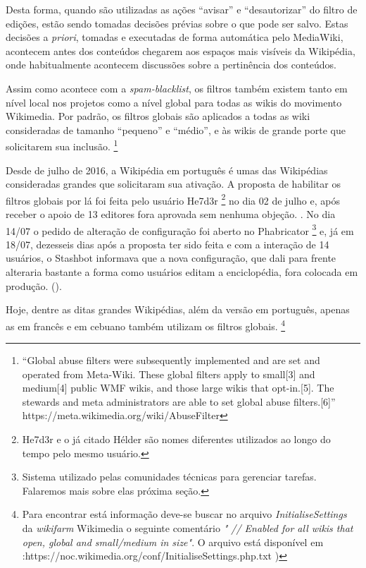 Desta forma, quando são utilizadas as ações ``avisar'' e ``desautorizar'' do filtro de edições, estão sendo tomadas decisões prévias sobre o que pode ser salvo. Estas decisões a \textit{priori}, tomadas e executadas de forma automática pelo MediaWiki, acontecem antes dos conteúdos chegarem aos espaços mais visíveis da Wikipédia, onde habitualmente acontecem discussões sobre a pertinência dos conteúdos.


Assim como acontece com a \textit{spam-blacklist}, os filtros também existem tanto em nível local nos projetos como a nível global para todas as wikis do movimento Wikimedia. Por padrão, os filtros globais são aplicados a todas as wiki consideradas de tamanho ``pequeno'' e ``médio'', e às wikis de grande porte que solicitarem sua inclusão. \footnote{``Global abuse filters were subsequently implemented and are set and operated from Meta-Wiki. These global filters apply to small[3] and medium[4] public WMF wikis, and those large wikis that opt-in.[5]. The stewards and meta administrators are able to set global abuse filters.[6]'' https://meta.wikimedia.org/wiki/AbuseFilter}

Desde de julho de 2016, a Wikipédia em português é umas das Wikipédias consideradas grandes que solicitaram sua ativação. A proposta de habilitar os filtros globais por lá foi feita pelo usuário He7d3r \footnote{He7d3r e o já citado Hélder são nomes diferentes utilizados ao longo do tempo pelo mesmo usuário.} no dia 02 de julho e, após receber o apoio de 13 editores fora aprovada sem nenhuma objeção. . No dia 14/07 o pedido de alteração de configuração foi aberto no Phabricator \footnote{Sistema utilizado pelas comunidades técnicas para gerenciar tarefas. Falaremos mais sobre elas próxima seção.} e,  já em 18/07, dezesseis dias após a proposta ter sido feita e com a interação de 14 usuários, o Stashbot informava que a nova configuração, que dali para frente alteraria bastante a forma como usuários editam a enciclopédia, fora colocada em produção. (\cite{enable_global_abusefilters_ptwiki}).

Hoje, dentre as ditas grandes Wikipédias, além da versão em português, apenas as em francês e em cebuano também utilizam os filtros globais. \footnote{ Para encontrar está informação deve-se buscar no arquivo \textit{InitialiseSettings} da \textit{wikifarm} Wikimedia o seguinte comentário \textit{" // Enabled for all wikis that open, global and small/medium in size"}. O arquivo está disponível em  :https://noc.wikimedia.org/conf/InitialiseSettings.php.txt )}

